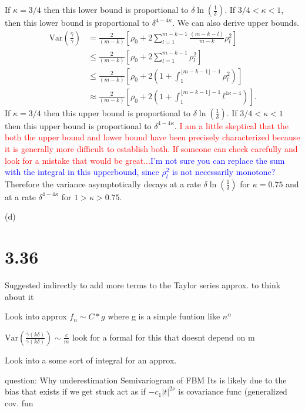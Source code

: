 \documentclass{article}
\begin{document}
If $\kappa = 3/4$ then this lower bound is proportional to $\delta\ln(\frac{1}{\delta})$. If $3/4<\kappa<1$, then this lower bound is proportional to $\delta^{4-4\kappa}$. We can also derive upper bounds.
\begin{align*}
    \text{Var}\left(\frac{\hat{\gamma}}{\gamma}\right) &= \frac{2}{(m-k)} [\rho_{0}+2\sum_{l=1}^{m-k-1} \frac{(m-k-l)}{m-k}\rho_{l}^2] 
\\
&\leq \frac{2}{(m-k)} [\rho_{0}+2\sum_{l=1}^{m-k-1} \rho_{l}^2]
\\
&\leq \frac{2}{(m-k)} [\rho_{0}+2(1+\int_{1}^{\lfloor m-k-1\rfloor-1} \rho_{l}^2)]\\
&\approx \frac{2}{(m-k)} [\rho_{0}+2(1+\int_{1}^{\lfloor m-k-1\rfloor-1} l^{4\kappa-4})].
\end{align*}
If $\kappa = 3/4$ then this upper bound is proportional to 
$\delta\ln(\frac{1}{\delta})$.
If $3/4<\kappa<1$ then this upper bound is proportional to $\delta^{4-4\kappa}$. 
\textcolor{red}{I am a little skeptical that the both the upper bound and lower bound have been precisely characterized because it is generally more difficult to establish both. If someone can check carefully and look for a mistake that would be great...}\textcolor{blue}{I'm not sure you can replace the sum with the integral in this upperbound, since $\rho_l^2$ is not necessarily monotone?}
Therefore the variance asymptotically decays at a rate $\delta\ln(\frac{1}{\delta})$ for $\kappa = 0.75$ and at a rate $\delta^{4-4\kappa}$ for $1>\kappa > 0.75$.
\medskip

\noindent
(d)


\section*{3.36}


\color{red} Suggested indirectly to add more terms to the Taylor series approx. to think about it 

Look into approx $f_n \sim C * g$ where g is a simple funtion like $n^\alpha$

$\text{Var}(\frac{\hat \gamma(k \delta)}{\gamma (k \delta)}) \sim \frac{c}{m}$ look for a formal for this that doesnt depend on m

Look into a some sort of integral for an approx.

question: Why underestimation
Semivariogram of FBM 
Its is likely due to the bias that exists
if we get stuck act as if $-c_1 |t|^{2\nu}$ is covariance func (generalized cov. fun
\end{document}
